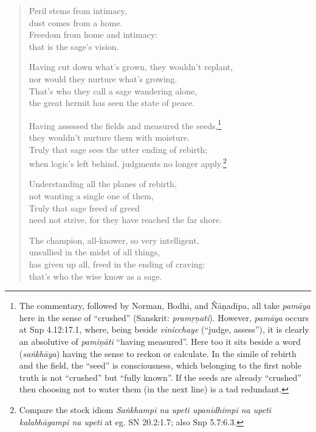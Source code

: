 \documentclass[12pt,openany]{book}%
\begin{document}
\begin{verse}%
Peril stems from intimacy, \\
dust comes from a home. \\
Freedom from home and intimacy: \\
that is the sage’s vision. 

Having cut down what’s grown, they wouldn’t replant, \\
nor would they nurture what’s growing. \\
That’s who they call a sage wandering alone, \\
the great hermit has seen the state of peace. 

Having assessed the fields and measured the seeds,\footnote{The commentary, followed by Norman, Bodhi, and \textsanskrit{Ñāṇadīpa}, all take \textit{\textsanskrit{pamāya}} here in the sense of “crushed” (Sanskrit: \textit{\textsanskrit{pramṛṇati}}). However, \textit{\textsanskrit{pamāya}} occurs at Snp 4.12:17.1, where, being beside \textit{vinicchaye} (“judge, assess”), it is clearly an absolutive of \textit{\textsanskrit{pamiṇāti}} “having measured”. Here too it sits beside a word (\textit{\textsanskrit{saṅkhāya}}) having the sense to reckon or calculate. In the simile of rebirth and the field, the “seed” is consciousness, which belonging to the first noble truth is not “crushed” but “fully known”. If the seeds are already “crushed” then choosing not to water them (in the next line) is a tad redundant. } \\
they wouldn’t nurture them with moisture. \\
Truly that sage sees the utter ending of rebirth; \\
when logic’s left behind, judgments no longer apply.\footnote{Compare the stock idiom \textit{\textsanskrit{Saṅkhampi} na upeti upanidhimpi na upeti \textsanskrit{kalabhāgampi} na upeti} at eg. SN 20.2:1.7; also Snp 5.7:6.3. } 

Understanding all the planes of rebirth, \\
not wanting a single one of them, \\
Truly that sage freed of greed \\
need not strive, for they have reached the far shore. 

The champion, all-knower, so very intelligent, \\
unsullied in the midst of all things, \\
has given up all, freed in the ending of craving: \\
that’s who the wise know as a sage. 


\end{verse}
\end{document}
